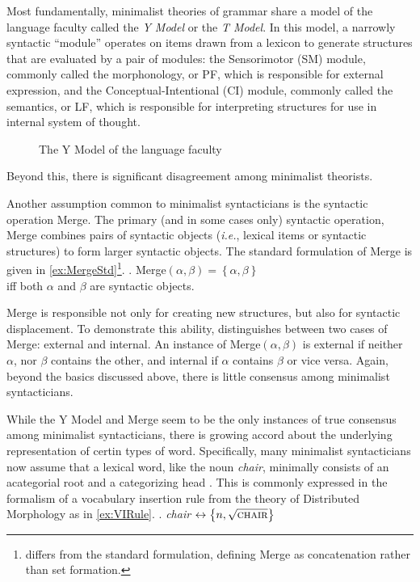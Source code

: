 \documentclass[MilwayThesis]{subfiles}
\begin{document}
Most fundamentally, minimalist theories of grammar share a model of the language faculty called the \textit{Y Model} or the \textit{T Model}.
In this model, a narrowly syntactic ``module'' operates on items drawn from a lexicon to generate structures that are evaluated by a pair of modules:
the Sensorimotor (SM) module, commonly called the morphonology, or PF, which is responsible for external expression, and the Conceptual-Intentional (CI) module, commonly called the semantics, or LF, which is responsible for interpreting structures for use in internal system of thought.
\begin{figure}[h]
	\centering
	\caption{The Y Model of the language faculty}
	\label{fig:YModel}
\end{figure}
Beyond this, there is significant disagreement among minimalist theorists.

Another assumption common to minimalist syntacticians is the syntactic operation Merge.
The primary (and in some cases only) syntactic operation, Merge combines pairs of syntactic objects (\textit{i.e.}, lexical items or syntactic structures) to form larger syntactic objects.
The standard formulation of Merge is given in \cref{ex:MergeStd}\footnote{
	\textcite{hornstein2009theory} differs from the standard formulation, defining Merge as concatenation rather than set formation.
}.
\ex.\label{ex:MergeStd} Merge$(\alpha, \beta) = \left\{ \alpha, \beta \right\}$\\
iff both $\alpha$ and $\beta$ are syntactic objects.

Merge is responsible not only for creating new structures, but also for syntactic displacement.
To demonstrate this ability, \textcite{chomsky2004beyond} distinguishes between two cases of Merge: external and internal.
An instance of Merge$(\alpha, \beta)$ is external if neither $\alpha$, nor $\beta$ contains the other, and internal if $\alpha$ contains $\beta$ or vice versa.
Again, beyond the basics discussed above, there is little consensus among minimalist syntacticians.

While the Y Model and Merge seem to be the only instances of true consensus among minimalist syntacticians, there is growing accord about the underlying representation of certin types of word.
Specifically, many minimalist syntacticians now assume that a lexical word, like the noun \textit{chair}, minimally consists of an acategorial root and a categorizing head \parencite{borer2005name,marantz1997no}.
This is commonly expressed in the formalism of a vocabulary insertion rule from the theory of Distributed Morphology as in \cref{ex:VIRule}.
\ex.\label{ex:VIRule} \textit{chair} $\leftrightarrow \left\{ n, \sqrt{\textsc{chair}} \right\}$
\end{document}

